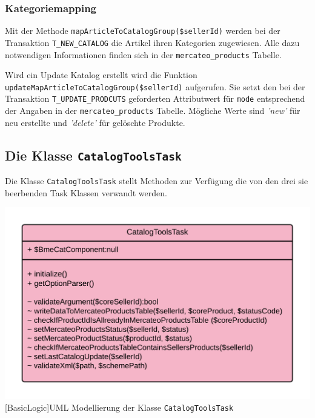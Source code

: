 	\subsubsection{Kategoriemapping}
	
	Mit der Methode \texttt{mapArticleToCatalogGroup(\$sellerId)} werden bei der Transaktion \texttt{T\_NEW\_CATALOG} die Artikel ihren Kategorien zugewiesen. Alle dazu notwendigen Informationen finden sich in der \texttt{mercateo\_products} Tabelle.
	
	Wird ein Update Katalog erstellt wird die Funktion \texttt{updateMapArticleToCatalogGroup(\$sellerId)} aufgerufen. Sie setzt den bei der Transaktion \texttt{T\_UPDATE\_PRODCUTS} geforderten Attributwert für \texttt{mode} entsprechend der Angaben in der \texttt{mercateo\_products} Tabelle.
	Mögliche Werte sind \textit{'new'} für neu erstellte und \textit{'delete'} für gelöschte Produkte.
	
	\subsection{Die Klasse \texttt{CatalogToolsTask}}
	
	Die Klasse \texttt{CatalogToolsTask} stellt Methoden zur Verfügung die von den drei sie beerbenden Task Klassen verwandt werden.
	
	\begin{minipage}{\linewidth}
		\vspace{1em}
		\centering
		\includegraphics[width=0.7 \linewidth]{img/CatalogToolsTaskUML}
		[BasicLogic]{UML Modellierung der Klasse \texttt{CatalogToolsTask}}
		\vspace{1em}
	\end{minipage}
	
